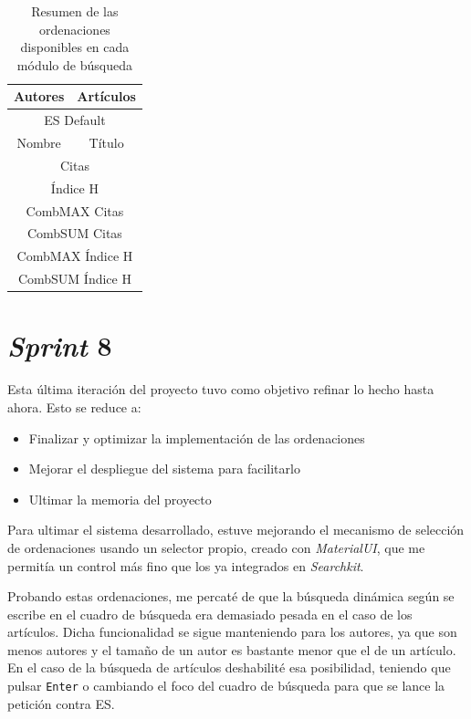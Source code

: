 \begin{table} [h!]
	\centering
	\begin{tabular}{| c | c |}
		\hline
		\textbf{Autores} & \textbf{Artículos}\\
		\hline\hline
		\multicolumn{2}{|c|}{\acrshort{ES} Default} \\ \hline
		Nombre & Título \\ \hline
		\multicolumn{2}{|c|}{Citas} \\ \hline 
		\multicolumn{2}{|c|}{Índice H} \\ \hline
		\multicolumn{2}{|c|}{CombMAX Citas} \\ \hline
		\multicolumn{2}{|c|}{CombSUM Citas} \\ \hline
		\multicolumn{2}{|c|}{CombMAX Índice H} \\ \hline
		\multicolumn{2}{|c|}{CombSUM Índice H } \\ \hline
		
	\end{tabular}
	\caption{Resumen de las ordenaciones disponibles en cada módulo de búsqueda}
\end{table}


\section{\textit{Sprint} 8}
Esta última iteración del proyecto tuvo como objetivo refinar lo hecho hasta ahora. Esto se reduce a:
\begin{itemize}
	\item Finalizar y optimizar la implementación de las ordenaciones 
	\item Mejorar el despliegue del sistema para facilitarlo
	\item Ultimar la memoria del proyecto
\end{itemize}

Para ultimar el sistema desarrollado, estuve mejorando el mecanismo de selección de ordenaciones usando un selector propio, creado con \textit{MaterialUI}, que me permitía un control más fino que los ya integrados en \textit{Searchkit}. 

Probando estas ordenaciones, me percaté de que la búsqueda dinámica según se escribe en el cuadro de búsqueda era demasiado pesada en el caso de los artículos. Dicha funcionalidad se sigue manteniendo para los autores, ya que son menos autores y el tamaño de un autor es bastante menor que el de un artículo. En el caso de la búsqueda de artículos deshabilité esa posibilidad, teniendo que pulsar \texttt{Enter} o cambiando el foco del cuadro de búsqueda para que se lance la petición contra \acrshort{ES}.

